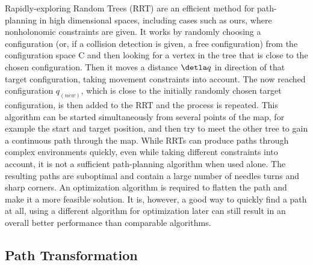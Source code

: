 Rapidly-exploring Random Trees (RRT)\cite{40} are an efficient method for path-planning in high dimensional spaces, including cases such as ours, where nonholonomic constraints are given.\cite{33,34} It works by randomly choosing a configuration (or, if a collision detection is given, a free configuration) from the configuration space C and then looking for a vertex in the tree that is close to the chosen configuration. Then it moves a distance $\detla q$ in direction of that target configuration, taking movement constraints into account. The now reached configuration $q_(new)$, which is close to the initially randomly chosen target configuration, is then added to the RRT and the process is repeated. This algorithm can be started simultaneously from several points of the map, for example the start and target position, and then try to meet the other tree to gain a continuous path through the map. While RRTs can produce paths through complex environments quickly, even while taking different constraints into account, it is not a sufficient path-planning algorithm when used alone. The resulting paths are suboptimal and contain a large number of needles turns and sharp corners. An optimization algorithm is required to flatten the path and make it a more feasible solution. It is, however, a good way to quickly find a path at all, using a different algorithm for optimization later can still result in an overall better performance than comparable algorithms. 

\subsection{Path Transformation}
\label{sec:pathtransformation}

